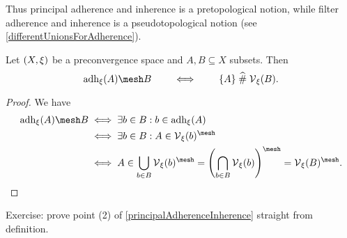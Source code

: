 Thus principal adherence and inherence is a pretopological notion, while filter adherence and inherence is a pseudotopological notion (see \ref{differentUnionsForAdherence}).
\begin{corollary} \label{setAdherenceInherence}
Let $\left( X,\xi \right)$ be a preconvergence space and $A,B\subseteq X$ subsets. Then
\[ \adh_\xi(A) \mesh B \qquad\iff\qquad \{A\} \amesh \vicinity_\xi(B). \]
\end{corollary}
\begin{proof}
We have
\begin{align*}
\adh_\xi(A) \mesh B &\iff \exists b\in B: b\in \adh_\xi(A) \\
&\iff \exists b\in B: A\in \vicinity_\xi(b)^{\mesh} \\
&\iff A \in \bigcup_{b\in B}\vicinity_\xi(b)^{\mesh} = \left(\bigcap_{b\in B}\vicinity_\xi(b)\right)^{\mesh} = \vicinity_\xi(B)^{\mesh}.
\end{align*}
\end{proof}

\begin{note}
Exercise: prove point (2) of \ref{principalAdherenceInherence} straight from definition.
\end{note}

